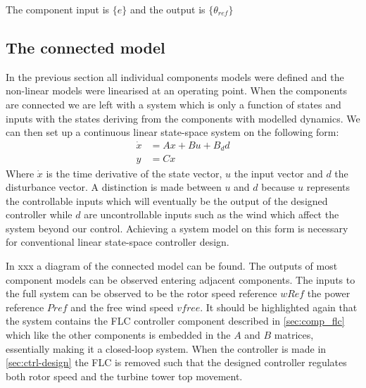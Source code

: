 The component input is $ \{e \} $ and the output is $ \{\theta_{ref} \} $


%
%


\subsection{The connected model} \label{sec:comp_connected}
In the previous section all individual components models were defined and the non-linear models were linearised at an operating point. When the components are connected we are left with a system which is only a function of states and inputs with the states deriving from the components with modelled dynamics. We can then set up a continuous linear state-space system on the following form:
\begin{equation}\label{eq:state-space-sys}
	\begin{split}
		\dot x &= A x + B u + B_d d \\
		y &= Cx
	\end{split}
\end{equation}
Where $ \dot x $ is the time derivative of the state vector, $ u $ the input vector and $ d $ the disturbance vector. A distinction is made between $ u $ and $ d $ because $ u $ represents the controllable inputs which will eventually be the output of the designed controller while $ d $ are uncontrollable inputs such as the wind which affect the system beyond our control. Achieving a system model on this form is necessary for conventional linear state-space controller design.

In xxx a diagram of the connected model can be found. The outputs of most component models can be observed entering adjacent components. The inputs to the full system can be observed to be the rotor speed reference $ wRef $ the power reference $ Pref $ and the free wind speed $ vfree $. It should be highlighted again that the system contains the FLC controller component described in \cref{sec:comp_flc} which like the other components is embedded in the $ A $ and $ B $ matrices, essentially making it a closed-loop system. When the controller is made in \cref{sec:ctrl-design} the FLC is removed such that the designed controller regulates both rotor speed and the turbine tower top movement.

